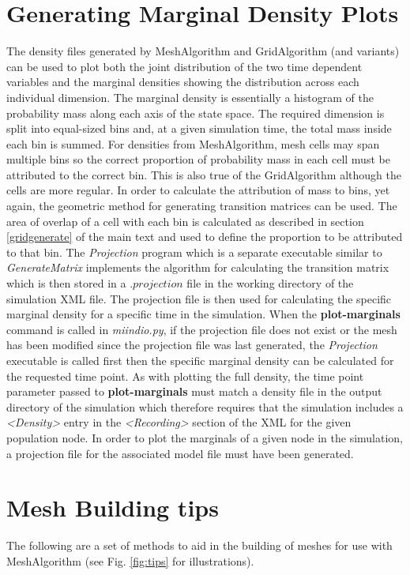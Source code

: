 \documentclass[utf8]{frontiers_suppmat} %
\begin{document}
\section{Generating Marginal Density Plots}
\label{marginalsdensities}
The density files generated by MeshAlgorithm and GridAlgorithm (and variants) can be used to plot both the joint distribution of the two time dependent variables and the marginal densities showing the distribution across each individual dimension. The marginal density is essentially a histogram of the probability mass along each axis of the state space. The required dimension is split into equal-sized bins and, at a given simulation time, the total mass inside each bin is summed. For densities from MeshAlgorithm, mesh cells may span multiple bins so the correct proportion of probability mass in each cell must be attributed to the correct bin. This is also true of the GridAlgorithm although the cells are more regular. In order to calculate the attribution of mass to bins, yet again, the geometric method for generating transition matrices can be used. The area of overlap of a cell with each bin is calculated as described in section \ref{gridgenerate} of the main text and used to define the proportion to be attributed to that bin. The \textit{Projection} program which is a separate executable similar to \textit{GenerateMatrix} implements the algorithm for calculating the transition matrix which is then stored in a $.projection$ file in the working directory of the simulation XML file. The projection file is then used for calculating the specific marginal density for a specific time in the simulation. When the \textbf{plot-marginals} command is called in \textit{miindio.py}, if the projection file does not exist or the mesh has been modified since the projection file was last generated, the \textit{Projection} executable is called first then the specific marginal density can be calculated for the requested time point. As with plotting the full density, the time point parameter passed to \textbf{plot-marginals} must match a density file in the output directory of the simulation which therefore requires that the simulation includes a \textit{\textless Density\textgreater} entry in the \textit{\textless Recording\textgreater} section of the XML for the given population node. In order to plot the marginals of a given node in the simulation, a projection file for the associated model file must have been generated.

\section{Mesh Building tips}
\label{meshtips}
The following are a set of methods to aid in the building of meshes for use with MeshAlgorithm (see Fig. \ref{fig:tips} for illustrations).\\
\end{document}

